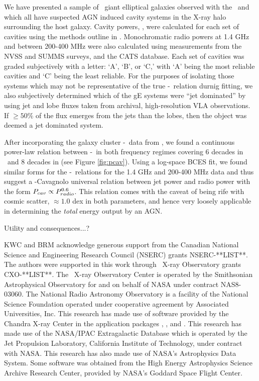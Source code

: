 \documentclass{emulateapj}
\begin{document}
We have presented a sample of \samp\ giant elliptical galaxies
observed with the \cxo\ and which all have suspected AGN induced
cavity systems in the X-ray halo surrounding the host galaxy. Cavity
powers, \pcav, were calculated for each set of cavities using the
methods outline in \citet{rafferty06}. Monochromatic radio powers at
1.4 GHz and between 200-400 MHz were also calculated using
measurements from the NVSS and SUMMS surveys, and the CATS database.
Each set of cavities was graded subjectively with a letter: `A', `B',
or `C,' with `A' being the most reliable cavities and `C' being the
least reliable. For the purposes of isolating those systems which may
not be representative of the true \pcav-\prad\ relation durnig
fitting, we also subjectively determined which of the gE systems were
``jet dominated'' by using jet and lobe fluxes taken from archival,
high-resolution VLA observations. If $\ge 50\%$ of the flux emerges
from the jets than the lobes, then the object was deemed a jet
dominated system.

After incorporating the galaxy cluster \pcav-\prad\ data from
\citep{birzan08}, we found a continuous power-law relation between
\pcav-\prad\ in both frequency regimes covering 6 decades in
\prad\ and 8 decades in \pcav (see Figure \ref{fig:pcav}). Using a
log-space BCES fit, we found similar forms for the
\pcav-\prad\ relations for the 1.4 GHz and 200-400 MHz data and thus
suggest a \birzan-Cavagnolo universal relation between jet power and
radio power with the form $P_{cav} \propto P_{radio}^{0.6}$. This relation
comes with the caveat of being rife with cosmic scatter, $\approx 1.0$
dex in both parameters, and hence very loosely applicable in
determining the {\it{total}} energy output by an AGN.

Utility and consequences...?

\acknowledgements

KWC and BRM acknowledge generous support from the Canadian National
Science and Engineering Research Council (NSERC) grants
NSERC-**LIST**. The authors were supported in this work through
\chandra\ X-ray Observatory grants CXO-**LIST**. The \chandra\ X-ray
Observatory Center is operated by the Smithsonian Astrophysical
Observatory for and on behalf of NASA under contract NAS8-03060. The
National Radio Astronomy Observatory is a facility of the National
Science Foundation operated under cooperative agreement by Associated
Universities, Inc. This research has made use of software provided by
the Chandra X-ray Center in the application packages \ciao, \chips,
and \sherpa. This research has made use of the NASA/IPAC Extragalactic
Database which is operated by the Jet Propulsion Laboratory,
California Institute of Technology, under contract with NASA. This
research has also made use of NASA's Astrophysics Data System. Some
software was obtained from the High Energy Astrophysics Science
Archive Research Center, provided by NASA's Goddard Space Flight
Center.
\end{document}
